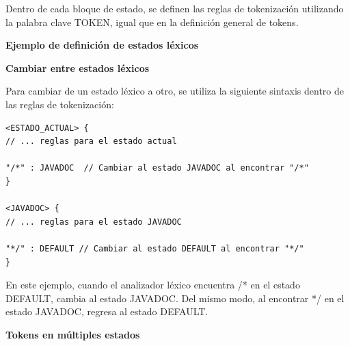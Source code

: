 
Dentro de cada bloque de estado, se definen las reglas de tokenización utilizando la palabra clave TOKEN, igual que en la definición general de tokens.

\phantom{text}

\noindent \textbf{Ejemplo de definición de estados léxicos}

\phantom{text}



\phantom{text}

\noindent \textbf{Cambiar entre estados léxicos}

\phantom{text}

Para cambiar de un estado léxico a otro, se utiliza la siguiente sintaxis dentro de las reglas de tokenización:

\lstset{inputencoding=utf8/latin1}
\begin{lstlisting}
<ESTADO_ACTUAL> {
// ... reglas para el estado actual

"/*" : JAVADOC  // Cambiar al estado JAVADOC al encontrar "/*" 
} 

<JAVADOC> {
// ... reglas para el estado JAVADOC 

"*/" : DEFAULT // Cambiar al estado DEFAULT al encontrar "*/"
}
\end{lstlisting}

En este ejemplo, cuando el analizador léxico encuentra /* en el estado DEFAULT, cambia al estado JAVADOC. Del mismo modo, al encontrar */ en el estado JAVADOC, regresa al estado DEFAULT.

\phantom{text}

\noindent \textbf{Tokens en múltiples estados}

\phantom{text}

